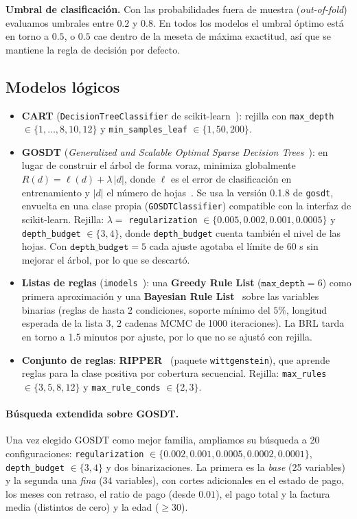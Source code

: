 \documentclass[a4paper,11pt]{article}
\begin{document}
\textbf{Umbral de clasificación.} Con las probabilidades fuera de muestra (\textit{out-of-fold}) evaluamos umbrales entre $0.2$ y $0.8$. En todos los modelos el umbral óptimo está en torno a $0.5$, o $0.5$ cae dentro de la meseta de máxima exactitud, así que se mantiene la regla de decisión por defecto.

\subsection{Modelos lógicos}
\begin{itemize}
    \item \textbf{CART} (\texttt{DecisionTreeClassifier} de scikit-learn~\cite{breiman1984,pedregosa2011}): rejilla con \texttt{max\_depth} $\in \{1,\dots,8,10,12\}$ y \texttt{min\_samples\_leaf} $\in \{1, 50, 200\}$.
    \item \textbf{GOSDT} (\textit{Generalized and Scalable Optimal Sparse Decision Trees}~\cite{lin2020gosdt}): en lugar de construir el árbol de forma voraz, minimiza globalmente $R(d) = \ell(d) + \lambda\,|d|$, donde $\ell$ es el error de clasificación en entrenamiento y $|d|$ el número de hojas~\cite{slidesLogical}. Se usa la versión 0.1.8 de \texttt{gosdt}, envuelta en una clase propia (\texttt{GOSDTClassifier}) compatible con la interfaz de scikit-learn. Rejilla: $\lambda =$ \texttt{regularization} $\in \{0.005, 0.002, 0.001, 0.0005\}$ y \texttt{depth\_budget} $\in \{3, 4\}$, donde \texttt{depth\_budget} cuenta también el nivel de las hojas. Con $\texttt{depth\_budget}=5$ cada ajuste agotaba el límite de 60 s sin mejorar el árbol, por lo que se descartó.
    \item \textbf{Listas de reglas} (\texttt{imodels}~\cite{singh2021imodels}): una \textbf{Greedy Rule List} ($\texttt{max\_depth}=6$) como primera aproximación y una \textbf{Bayesian Rule List}~\cite{letham2015} sobre las variables binarias (reglas de hasta 2 condiciones, soporte mínimo del $5\%$, longitud esperada de la lista 3, 2 cadenas MCMC de 1000 iteraciones). La BRL tarda en torno a 1.5 minutos por ajuste, por lo que no se ajustó con rejilla.
    \item \textbf{Conjunto de reglas}: \textbf{RIPPER}~\cite{cohen1995} (paquete \texttt{wittgenstein}), que aprende reglas para la clase positiva por cobertura secuencial. Rejilla: \texttt{max\_rules} $\in \{3, 5, 8, 12\}$ y \texttt{max\_rule\_conds} $\in \{2, 3\}$.
\end{itemize}

\paragraph{Búsqueda extendida sobre GOSDT.} Una vez elegido GOSDT como mejor familia, ampliamos su búsqueda a 20 configuraciones: \texttt{regularization} $\in \{0.002, 0.001, 0.0005, 0.0002, 0.0001\}$, \texttt{depth\_budget} $\in \{3, 4\}$ y dos binarizaciones. La primera es la \textit{base} (25 variables) y la segunda una \textit{fina} (34 variables), con cortes adicionales en el estado de pago, los meses con retraso, el ratio de pago (desde $0.01$), el pago total y la factura media (distintos de cero) y la edad ($\geq 30$).
\end{document}
